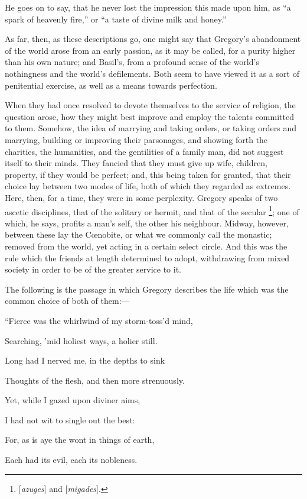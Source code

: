 He goes on to say, that he never lost the impression this made upon
him, as ``a spark of heavenly fire,'' or ``a taste of
divine milk and honey.''

As far, then, as these descriptions go, one might say that Gregory's
abandonment of the world arose from an early passion, as it may be
called, for a purity higher than his own nature; and Basil's, from a
profound sense of the world's nothingness and the world's defilements.
Both seem to have viewed it as a sort of penitential exercise, as well
as a means towards perfection.

When they had once resolved to devote themselves to the service of
religion, the question arose, how they might best improve and employ
the talents committed to them. Somehow, the idea of marrying and
taking orders, or taking orders and marrying, building or improving
their parsonages, and showing forth the charities, the humanities, and
the gentilities of a family man, did not suggest itself to their
minds. They fancied that they must give up wife, children, property,
if they would be perfect; and, this being taken for granted, that
their choice lay between two modes of life, both of which they
regarded as extremes. Here, then, for a time, they were in some
perplexity. Gregory speaks of two ascetic disciplines, that of the
solitary or hermit, and that of the secular \footnote{[\emph{azuges}] and [\emph{migades}].}; one of which, he says, profits a man's self, the other his
neighbour. Midway, however, between these lay the Cœnobite, or what
we commonly call the monastic; removed from the world, yet acting in a
certain select circle. And this was the rule which the friends at
length determined to adopt, withdrawing from mixed society in order to
be of the greater service to it.

The following is the passage in which Gregory describes the life
which was the common choice of both of them:—

``Fierce was the whirlwind of my storm-toss'd mind,

Searching, 'mid holiest ways, a holier still.

Long had I nerved me, in the depths to sink

Thoughts of the flesh, and then more strenuously.

Yet, while I gazed upon diviner aims,

I had not wit to single out the best:

For, as is aye the wont in things of earth,

Each had its evil, each its nobleness.

